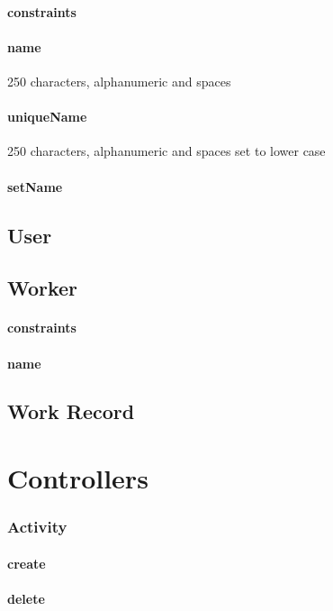 \documentclass[12pt]{article}
\begin{document}
\paragraph{constraints}
\paragraph{name} 250 characters, alphanumeric and spaces 
\paragraph{uniqueName} 250 characters, alphanumeric and spaces  set to lower case
\paragraph{setName}

\setcounter{paragraph}{0}
\subsection{User}\label{sec:DUser}
\subsection{Worker}\label{sec:DWorker}
\paragraph{constraints}
\paragraph{name}

\setcounter{paragraph}{0}
\subsection{Work Record}\label{sec:DWork Record}

\section{Controllers}\label{sec:Controllers}

\subsubsection{Activity}\label{sec:CActivity}
\paragraph{create}
\paragraph{delete}
\end{document}
